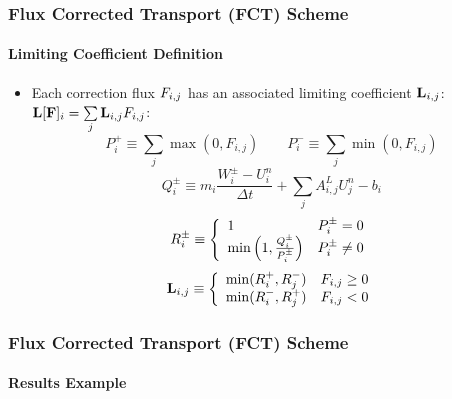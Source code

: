 \documentclass{beamer}
\begin{document}
\begin{frame}
\frametitle{Flux Corrected Transport (FCT) Scheme}
\framesubtitle{Limiting Coefficient Definition}

\begin{itemize}
   \item Each correction flux $F_{i,j}$ has an associated limiting
   coefficient $\mathbf{L}_{i,j}$: $\mathbf{L}[\mathbf{F}]_i = \sum\limits_j \mathbf{L}_{i,j} F_{i,j}$:
\begin{equation}\label{eq:P_defs}
   P_i^+ \equiv \sum\limits_j\max(0,F_{i,j}) \qquad
   P_i^- \equiv \sum\limits_j\min(0,F_{i,j})
\end{equation}
\begin{equation}\label{eq:Q_defs}
      Q_i^\pm \equiv m_i\frac{W_i^\pm-U_i^n}{\Delta t}
      + \sum\limits_j A_{i,j}^L U_j^n - b_i
\end{equation}
\begin{equation}\label{eq:R_defs}
   R_i^\pm \equiv\left\{
      \begin{array}{l l}
         1                                          & P_i^\pm = 0\\
         \min\left(1,\frac{Q_i^\pm}{P_i^\pm}\right) & P_i^\pm \ne 0
      \end{array}
      \right.
\end{equation}
\begin{equation}
   \mathbf{L}_{i,j} \equiv\left\{
      \begin{array}{l l}
         \min(R_i^+,R_j^-) & F_{i,j} \geq 0\\
         \min(R_i^-,R_j^+) & F_{i,j} < 0
      \end{array}
      \right.
\end{equation}
\end{itemize}

\end{frame}
\begin{frame}
\frametitle{Flux Corrected Transport (FCT) Scheme}
\framesubtitle{Results Example}


\end{frame}
\end{document}
